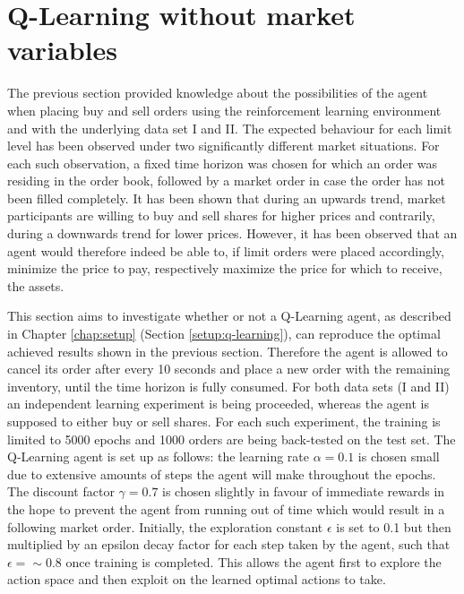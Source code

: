 \section{Q-Learning without market variables}
The previous section provided knowledge about the possibilities of the agent when placing buy and sell orders using the reinforcement learning environment and with the underlying data set I and II.
The expected behaviour for each limit level has been observed under two significantly different market situations.
For each such observation, a fixed time horizon was chosen for which an order was residing in the order book, followed by a market order in case the order has not been filled completely.
It has been shown that during an upwards trend, market participants are willing to buy and sell shares for higher prices and contrarily, during a downwards trend for lower prices.
However, it has been observed that an agent would therefore indeed be able to, if limit orders were placed accordingly, minimize the price to pay, respectively maximize the price for which to receive, the assets.

This section aims to investigate whether or not a Q-Learning agent, as described in Chapter \ref{chap:setup} (Section \ref{setup:q-learning}), can reproduce the optimal achieved results shown in the previous section.
Therefore the agent is allowed to cancel its order after every 10 seconds and place a new order with the remaining inventory, until the time horizon is fully consumed.
For both data sets (I and II) an independent learning experiment is being proceeded, whereas the agent is supposed to either buy or sell shares.
For each such experiment, the training is limited to 5000 epochs and 1000 orders are being back-tested on the test set.
The Q-Learning agent is set up as follows:
the learning rate $\alpha=0.1$ is chosen small due to extensive amounts of steps the agent will make throughout the epochs.
The discount factor $\gamma=0.7$ is chosen slightly in favour of immediate rewards in the hope to prevent the agent from running out of time which would result in a following market order.
Initially, the exploration constant $\epsilon$ is set to 0.1 but then multiplied by an epsilon decay factor for each step taken by the agent, such that $\epsilon=\sim0.8$ once training is completed.
This allows the agent first to explore the action space and then exploit on the learned optimal actions to take.

